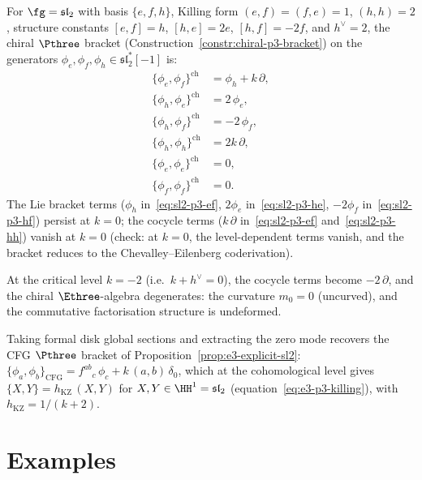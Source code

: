 \begin{example}
\label{ex:sl2-chiral-e3}
For $\fg = \mathfrak{sl}_2$ with basis $\{e, f, h\}$,
Killing form $(e,f) = (f,e) = 1$, $(h,h) = 2$,
structure constants $[e,f] = h$, $[h,e] = 2e$, $[h,f] = -2f$,
and $h^\vee = 2$, the chiral $\Pthree$ bracket
(Construction~\ref{constr:chiral-p3-bracket}) on the
generators $\phi_e, \phi_f, \phi_h \in \mathfrak{sl}_2^*[-1]$
is:
\begin{align}
 \label{eq:sl2-p3-ef}
 \{\phi_e, \phi_f\}^{\mathrm{ch}}
 &= \phi_h + k\,\partial, \\
 \label{eq:sl2-p3-he}
 \{\phi_h, \phi_e\}^{\mathrm{ch}}
 &= 2\,\phi_e, \\
 \label{eq:sl2-p3-hf}
 \{\phi_h, \phi_f\}^{\mathrm{ch}}
 &= -2\,\phi_f, \\
 \label{eq:sl2-p3-hh}
 \{\phi_h, \phi_h\}^{\mathrm{ch}}
 &= 2k\,\partial, \\
 \label{eq:sl2-p3-ee}
 \{\phi_e, \phi_e\}^{\mathrm{ch}}
 &= 0, \\
 \label{eq:sl2-p3-ff}
 \{\phi_f, \phi_f\}^{\mathrm{ch}}
 &= 0.
\end{align}
The Lie bracket terms ($\phi_h$ in~\eqref{eq:sl2-p3-ef},
$2\phi_e$ in~\eqref{eq:sl2-p3-he},
$-2\phi_f$ in~\eqref{eq:sl2-p3-hf}) persist at $k = 0$;
the cocycle terms ($k\,\partial$ in~\eqref{eq:sl2-p3-ef}
and~\eqref{eq:sl2-p3-hh}) vanish at $k = 0$
(check: at $k = 0$, the level-dependent terms
vanish, and the bracket reduces to the Chevalley--Eilenberg
coderivation).

At the critical level $k = -2$ (i.e.\ $k + h^\vee = 0$), the cocycle
terms become $-2\,\partial$, and the chiral
$\Ethree$-algebra degenerates: the curvature $m_0 = 0$
(uncurved), and the commutative factorisation structure is
undeformed.

Taking formal disk global sections and extracting the zero
mode recovers the CFG $\Pthree$ bracket of
Proposition~\ref{prop:e3-explicit-sl2}:
$\{\phi_a, \phi_b\}_{\mathrm{CFG}}
= f^{ab}{}_c\,\phi_c + k\,(a,b)\,\delta_0$, which at the
cohomological level gives
$\{X, Y\} = h_{\mathrm{KZ}}\,(X,Y)$ for
$X, Y \in \HH^1 = \mathfrak{sl}_2$
(equation~\eqref{eq:e3-p3-killing}), with
$h_{\mathrm{KZ}} = 1/(k+2)$.
\end{example}

\section{Examples}
\label{sec:examples}

